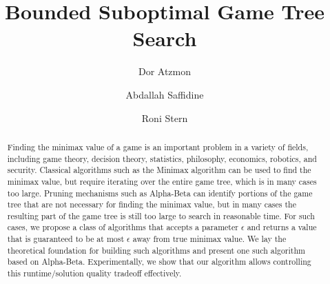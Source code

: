 \documentclass[runningheads]{llncs}
\begin{document}
%
\title{Bounded Suboptimal Game Tree Search}
%
%
\author{Dor Atzmon \and
Abdallah Saffidine \and
Roni Stern}
%
%
%
\maketitle              %

\begin{abstract}
Finding the minimax value of a game is an important problem in a variety of fields, including game theory, decision theory,  statistics, philosophy, economics, robotics, and security. Classical algorithms such as the Minimax algorithm can be used to find the minimax value, but require iterating over the entire game tree, which is in many cases too large. Pruning mechanisms such as Alpha-Beta can identify portions of the game tree that are not necessary for finding the minimax value, but in many cases the resulting part of the game tree is still too large to search in reasonable time. %
For such cases, we propose a class of algorithms that accepts a parameter $\epsilon$ and returns a value that is guaranteed to be at most $\epsilon$ away from true minimax value. We lay the theoretical foundation for building such algorithms and present one such algorithm based on Alpha-Beta. Experimentally, we show that our  algorithm allows controlling this runtime/solution quality tradeoff effectively. %




\end{abstract}
\end{document}
